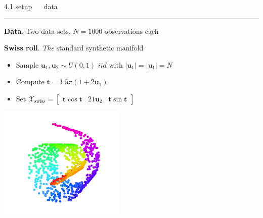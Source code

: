 \documentclass[11pt, compress, t, notes = noshow, xcolor = table, 
aspectratio = 1610]{beamer}
\newcommand{\highlight}[1]{\textcolor{highlightcol}{\textbf{#1}}}
\newcommand{\flexitem}[1]{\item[$\highlight{#1}$]}
\newcommand{\X}{\mathcal{X}}
\begin{document}
\LARGE
\begin{frame}{\textcolor{gray!90}{4.1 setup} ~~ data}
\normalsize
\vspace{-0.5cm}
\noindent \textcolor{gray!90}{\rule{\textwidth}{1pt}}
\smallskip

\textbf{Data}. Two data sets, $N = 1000$ observations each

\begin{minipage}[b]{0.65\textwidth}
  \textbf{Swiss roll}. \textit{The} standard synthetic manifold
  \begin{itemize}
    \flexitem{1} Sample $\bm{u}_1, \bm{u}_2 \sim U(0, 1)$ 
    $\mathit{ iid}$ with $\rvert \bm{u}_1 \rvert = \rvert \bm{u}_1 \rvert = N$
    \flexitem{2} Compute $\bm{t} = 1.5 \pi (1 + 2\bm{u}_1)$
    \flexitem{3} Set $\X_{\text{swiss}} = 
    \begin{bmatrix} \bm{t} \cos{\bm{t}} & 21 \bm{u}_2 & 
    \bm{t} \sin{\bm{t}} \end{bmatrix}$ 
  \end{itemize}
\end{minipage}%
\begin{minipage}[b]{0.35\textwidth}
  \centering
  \includegraphics[trim = 60 30 40 -20, clip, %
    width = 0.45\textwidth]{figures/swiss-roll}
\end{minipage}

\vspace{0.3cm}


\end{frame}
\end{document}
